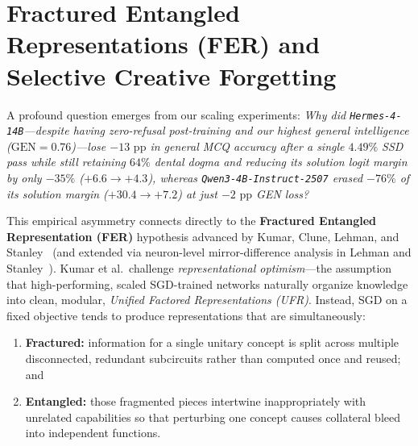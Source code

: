 \documentclass[10.5pt,letterpaper]{article}
\begin{document}
\section{Fractured Entangled Representations (FER) and Selective Creative Forgetting}
\label{sec:fer}

A profound question emerges from our scaling experiments: \emph{Why did \texttt{Hermes-4-14B}---despite having zero-refusal post-training and our highest general intelligence ($\text{GEN}\!=\!0.76$)---lose $-13\text{ pp}$ in general MCQ accuracy after a single $4.49\%$ SSD pass while still retaining $64\%$ dental dogma and reducing its solution logit margin by only $-35\%$ ($+6.6 \to +4.3$), whereas \texttt{Qwen3-4B-Instruct-2507} erased $-76\%$ of its solution margin ($+30.4 \to +7.2$) at just $-2\text{ pp}$ GEN loss?}

This empirical asymmetry connects directly to the \textbf{Fractured Entangled Representation (FER)} hypothesis advanced by Kumar, Clune, Lehman, and Stanley~\cite{kumar2025fer} (and extended via neuron-level mirror-difference analysis in Lehman and Stanley~\cite{lehman2026mirror}). Kumar et al.\ challenge \emph{representational optimism}---the assumption that high-performing, scaled SGD-trained networks naturally organize knowledge into clean, modular, \emph{Unified Factored Representations (UFR)}. Instead, SGD on a fixed objective tends to produce representations that are simultaneously:
\begin{enumerate}
  \item \textbf{Fractured:} information for a single unitary concept is split across multiple disconnected, redundant subcircuits rather than computed once and reused; and
  \item \textbf{Entangled:} those fragmented pieces intertwine inappropriately with unrelated capabilities so that perturbing one concept causes collateral bleed into independent functions.
\end{enumerate}
\end{document}
